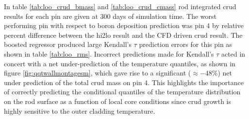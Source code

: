 In table \ref{tab:loo_crud_bmass} and \ref{tab:loo_crud_cmass} rod integrated crud results for each pin are given at 300 days of simulation time.  The worst performing pin with respect to boron deposition prediction was pin 4 by relative percent difference between the hi2lo result and the CFD driven crud result.  The boosted regressor produced large Kendall's $\tau$ prediction errors for this pin as shown in table \ref{tab:loo_rms}.  Incorrect predictions made for Kendall's $\tau$ acted in concert with a net under-prediction of the temperature quantiles, as shown in figure \ref{fig:qqtwallmontagesm}, which gave rise to a significant ($\approx -48\%$) net under prediction of the total crud mass on pin 4.  This highlights the importance of correctly predicting the conditional quantiles of the temperature distribution on the rod surface as a function of local core conditions since crud growth is highly sensitive to the outer cladding temperature.


